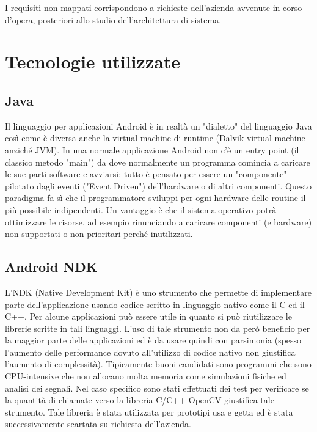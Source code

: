 I requisiti non mappati corrispondono a richieste dell'azienda avvenute in corso d'opera, posteriori allo studio dell'architettura di sistema.

\section{Tecnologie utilizzate}

\subsection{Java}

Il linguaggio per applicazioni Android è in realtà un "dialetto" del linguaggio Java così come è diversa anche la virtual machine di runtime (Dalvik virtual machine anziché JVM).
In una normale applicazione Android non c'è un entry point (il classico metodo "main") da dove normalmente un programma comincia a caricare le sue parti software e avviarsi: tutto è pensato per essere un "componente" pilotato dagli eventi ("Event Driven") dell'hardware o di altri componenti. Questo paradigma fa sì che il programmatore sviluppi per ogni hardware delle routine il più possibile indipendenti. Un vantaggio è che il sistema operativo potrà ottimizzare le risorse, ad esempio rinunciando a caricare componenti (e hardware) non supportati o non prioritari perché inutilizzati.

\subsection{Android NDK}

L'NDK (Native Development Kit) è uno strumento che permette di implementare parte dell'applicazione usando codice scritto in linguaggio nativo come il C ed il C++. Per alcune applicazioni può essere utile in quanto si può riutilizzare le librerie scritte in tali linguaggi. L'uso di tale strumento non da però beneficio per la maggior parte delle applicazioni ed è da usare quindi con parsimonia (spesso l'aumento delle performance dovuto all'utilizzo di codice nativo non giustifica l'aumento di complessità). Tipicamente buoni candidati sono programmi che sono CPU-intensive che non allocano molta memoria come simulazioni fisiche ed analisi dei segnali. Nel caso specifico sono stati effettuati dei test per verificare se la quantità di chiamate verso la libreria C/C++ OpenCV giustifica tale strumento. Tale libreria è stata utilizzata per prototipi usa e getta ed è stata successivamente scartata su richiesta dell'azienda.

